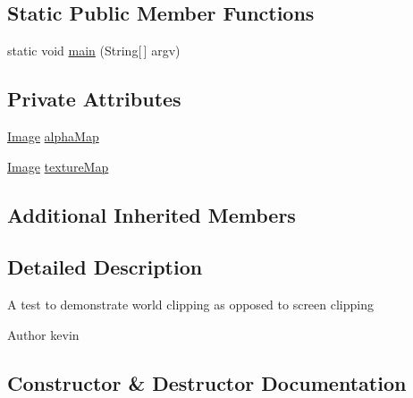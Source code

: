 \subsection*{Static Public Member Functions}
\begin{DoxyCompactItemize}
\item 
static void \mbox{\hyperlink{classorg_1_1newdawn_1_1slick_1_1tests_1_1_alpha_map_test_a9d30318bcf8f95383bfaf3a7ef3ed6e6}{main}} (String\mbox{[}$\,$\mbox{]} argv)
\end{DoxyCompactItemize}
\subsection*{Private Attributes}
\begin{DoxyCompactItemize}
\item 
\mbox{\hyperlink{classorg_1_1newdawn_1_1slick_1_1_image}{Image}} \mbox{\hyperlink{classorg_1_1newdawn_1_1slick_1_1tests_1_1_alpha_map_test_a1feaeb3164bd0e648d4f9cf7a63ce24a}{alpha\+Map}}
\item 
\mbox{\hyperlink{classorg_1_1newdawn_1_1slick_1_1_image}{Image}} \mbox{\hyperlink{classorg_1_1newdawn_1_1slick_1_1tests_1_1_alpha_map_test_a1ba492928b78eceb9442f13fb61a45f3}{texture\+Map}}
\end{DoxyCompactItemize}
\subsection*{Additional Inherited Members}


\subsection{Detailed Description}
A test to demonstrate world clipping as opposed to screen clipping

\begin{DoxyAuthor}{Author}
kevin 
\end{DoxyAuthor}


\subsection{Constructor \& Destructor Documentation}
\mbox{\label{classorg_1_1newdawn_1_1slick_1_1tests_1_1_alpha_map_test_a2b9c7ee910b1bd0c590f169936e535e7}} 
